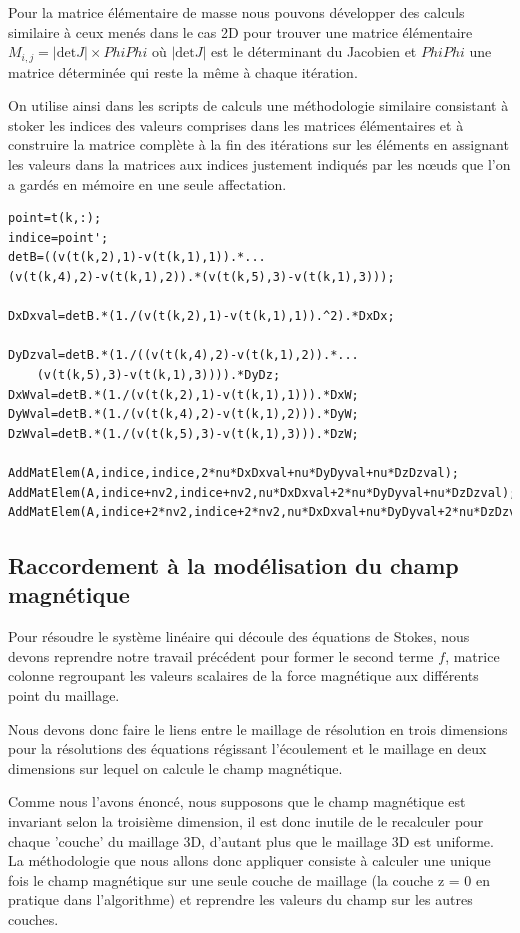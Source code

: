 \documentclass[a4paper,12pt,titlepage]{report}
\begin{document}
\begin{onehalfspace}
Pour la matrice élémentaire de masse nous pouvons développer des calculs similaire à ceux menés dans le cas 2D pour trouver une matrice élémentaire $M_{i, j} = |\text{det} J| \times PhiPhi$ où $|\text{det} J|$ est le déterminant du Jacobien et $PhiPhi$ une matrice déterminée qui reste la même à chaque itération.

On utilise ainsi dans les scripts de calculs une méthodologie similaire consistant à stoker les indices des valeurs comprises dans les matrices élémentaires et à construire la matrice complète à la fin des itérations sur les éléments en assignant les valeurs dans la matrices aux indices justement indiqués par les nœuds que l'on a gardés en mémoire en une seule affectation.

\begin{verbatim}
point=t(k,:);
indice=point';
detB=((v(t(k,2),1)-v(t(k,1),1)).*...
(v(t(k,4),2)-v(t(k,1),2)).*(v(t(k,5),3)-v(t(k,1),3)));
    
DxDxval=detB.*(1./(v(t(k,2),1)-v(t(k,1),1)).^2).*DxDx;
  
DyDzval=detB.*(1./((v(t(k,4),2)-v(t(k,1),2)).*...
    (v(t(k,5),3)-v(t(k,1),3)))).*DyDz;
DxWval=detB.*(1./(v(t(k,2),1)-v(t(k,1),1))).*DxW;
DyWval=detB.*(1./(v(t(k,4),2)-v(t(k,1),2))).*DyW;
DzWval=detB.*(1./(v(t(k,5),3)-v(t(k,1),3))).*DzW;
    
AddMatElem(A,indice,indice,2*nu*DxDxval+nu*DyDyval+nu*DzDzval);
AddMatElem(A,indice+nv2,indice+nv2,nu*DxDxval+2*nu*DyDyval+nu*DzDzval);
AddMatElem(A,indice+2*nv2,indice+2*nv2,nu*DxDxval+nu*DyDyval+2*nu*DzDzval);
\end{verbatim}
\subsection{Raccordement à la modélisation du champ magnétique}

Pour résoudre le système linéaire qui découle des équations de Stokes, nous devons reprendre notre travail précédent pour former le second terme $f$, matrice colonne regroupant les valeurs scalaires de la force magnétique aux différents point du maillage.

Nous devons donc faire le liens entre le maillage de résolution en trois dimensions pour la résolutions des équations régissant l'écoulement et le maillage en deux dimensions sur lequel on calcule le champ magnétique. 

Comme nous l'avons énoncé, nous supposons que le champ magnétique est invariant selon la troisième dimension, il est donc inutile de le recalculer pour chaque 'couche' du maillage 3D, d'autant plus que le maillage 3D est uniforme. 
La méthodologie que nous allons donc appliquer consiste à calculer une unique fois le champ magnétique sur une seule couche de maillage (la couche z = 0 en pratique dans l'algorithme) et reprendre les valeurs du champ sur les autres couches.


\end{onehalfspace}
\end{document}
